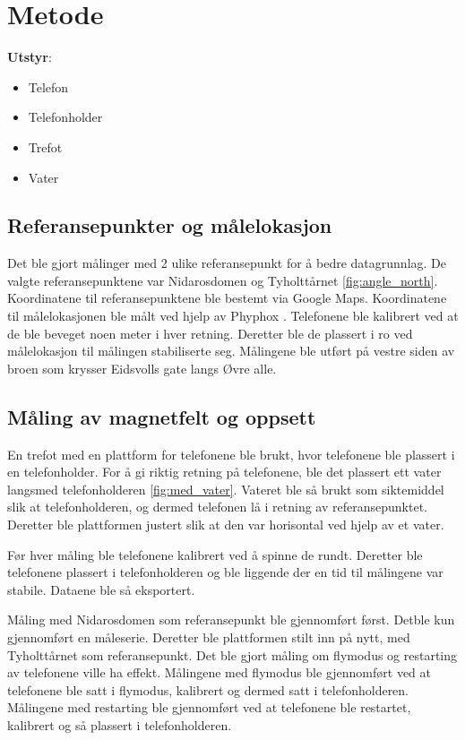 \section{Metode}
\noindent\textbf{Utstyr}:
\begin{itemize}
    \item Telefon
    \item Telefonholder
    \item Trefot
    \item Vater
\end{itemize}

\subsection{Referansepunkter og målelokasjon}
Det ble gjort målinger med 2 ulike referansepunkt for å bedre datagrunnlag. De valgte referansepunktene var Nidarosdomen og Tyholttårnet \ref{fig:angle_north}. Koordinatene til referansepunktene ble bestemt via Google Maps. Koordinatene til målelokasjonen ble målt ved hjelp av Phyphox \cite{phyphox}. Telefonene ble kalibrert ved at de ble beveget noen meter i hver retning. Deretter ble de plassert i ro ved målelokasjon til målingen stabiliserte seg. Målingene ble utført på vestre siden av broen som krysser Eidsvolls gate langs Øvre alle. 


\subsection{Måling av magnetfelt og oppsett}
En trefot med en plattform for telefonene ble brukt, hvor telefonene ble plassert i en telefonholder. For å gi riktig retning på telefonene, ble det plassert ett vater langsmed telefonholderen \ref{fig:med_vater}. Vateret ble så brukt som siktemiddel slik at telefonholderen, og dermed telefonen lå i retning av referansepunktet. Deretter ble plattformen justert slik at den var horisontal ved hjelp av et vater.

Før hver måling ble telefonene kalibrert ved å spinne de rundt. Deretter ble telefonene plassert i telefonholderen og ble liggende der en tid til målingene var stabile. Dataene ble så eksportert. 

Måling med Nidarosdomen som referansepunkt ble gjennomført først. Detble kun gjennomført en måleserie. Deretter ble plattformen stilt inn på nytt, med Tyholttårnet som referansepunkt. Det ble gjort måling om flymodus og restarting av telefonene ville ha effekt. Målingene med flymodus ble gjennomført ved at telefonene ble satt i flymodus, kalibrert og dermed satt i telefonholderen. Målingene med restarting ble gjennomført ved at telefonene ble restartet, kalibrert og så plassert i telefonholderen.

